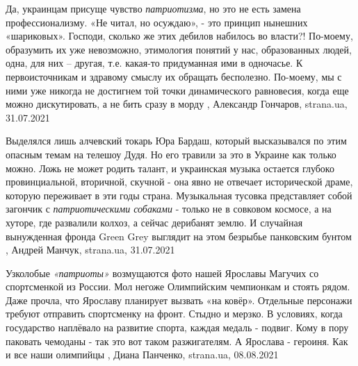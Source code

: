 Да, украинцам присуще чувство \emph{патриотизма}, но это не есть замена
профессионализму. «Не читал, но осуждаю», - это принцип нынешних «шариковых».
Господи, сколько же этих дебилов набилось во власти?! По-моему, образумить их
уже невозможно, этимология понятий у нас, образованных людей, одна, для них –
другая, т.е. какая-то придуманная ими в одночасье.  К первоисточникам и
здравому смыслу их обращать бесполезно. По-моему, мы с ними уже никогда не
достигнем той точки динамического равновесия, когда еще можно дискутировать, а
не бить сразу в морду
, 
Александр Гончаров, strana.ua, 31.07.2021

Выделялся лишь алчевский токарь Юра Бардаш, который высказывался по этим
опасным темам на телешоу Дудя. Но его травили за это в Украине как только
можно.  Ложь не может родить талант, и украинская музыка остается глубоко
провинциальной, вторичной, скучной - она явно не отвечает исторической драме,
которую переживает в эти годы страна. Музыкальная тусовка представляет собой
загончик с \emph{патриотическими собаками} - только не в совковом космосе, а на
хуторе, где развалили колхоз, а сейчас дерибанят землю.  И случайная
вынужденная фронда Green Grey выглядит на этом безрыбье панковским бунтом
, 
Андрей Манчук, strana.ua, 31.07.2021

Узколобые \emph{«патриоты»} возмущаются фото нашей Ярославы Магучих со
спортсменкой из России. Мол негоже Олимпийским чемпионкам и стоять рядом.  Даже
прочла, что Ярославу планирует вызвать «на ковёр». Отдельные персонажи требуют
отправить спортсменку на фронт.  Стыдно и мерзко. В условиях, когда государство
наплёвало на развитие спорта, каждая медаль - подвиг.  Кому в пору паковать
чемоданы - так это вот таком разжигателям.  А Ярослава - героиня. Как и все
наши олимпийцы
, 
Диана Панченко, strana.ua, 08.08.2021

